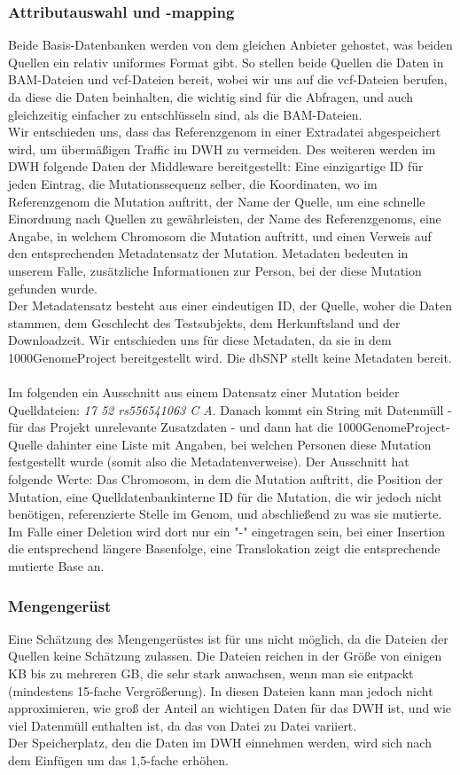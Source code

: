 \subsubsection{Attributauswahl und -mapping}
Beide Basis-Datenbanken werden von dem gleichen Anbieter gehostet, was beiden Quellen ein relativ uniformes Format gibt. So stellen beide Quellen die Daten in BAM-Dateien und vcf-Dateien bereit, wobei wir uns auf die vcf-Dateien berufen, da diese die Daten beinhalten, die wichtig sind für die Abfragen, und auch gleichzeitig einfacher zu entschlüsseln sind, als die BAM-Dateien.\\
Wir entschieden uns, dass das Referenzgenom in einer Extradatei abgespeichert wird, um übermäßigen Traffic im DWH zu vermeiden. Des weiteren werden im DWH folgende Daten der Middleware bereitgestellt: Eine einzigartige ID für jeden Eintrag, die Mutationssequenz selber, die Koordinaten, wo im Referenzgenom die Mutation auftritt, der Name der Quelle, um eine schnelle Einordnung nach Quellen zu gewährleisten, der Name des Referenzgenoms, eine Angabe, in welchem Chromosom die Mutation auftritt, und einen Verweis auf den entsprechenden Metadatensatz der Mutation. Metadaten bedeuten in unserem Falle, zusätzliche Informationen zur Person, bei der diese Mutation gefunden wurde.\\
Der Metadatensatz besteht aus einer eindeutigen ID, der Quelle, woher die Daten stammen, dem Geschlecht des Testsubjekts, dem Herkunftsland und der Downloadzeit. Wir entschieden uns für diese Metadaten, da sie in dem 1000GenomeProject bereitgestellt wird. Die dbSNP stellt keine Metadaten bereit.\\
\\
Im folgenden ein Ausschnitt aus einem Datensatz einer Mutation beider Quelldateien: \textit{17	52	rs556541063	C	A}. Danach kommt ein String mit Datenmüll - für das Projekt unrelevante Zusatzdaten - und dann hat die 1000GenomeProject-Quelle dahinter eine Liste mit Angaben, bei welchen Personen diese Mutation festgestellt wurde (somit also die Metadatenverweise). Der Ausschnitt hat folgende Werte: Das Chromosom, in dem die Mutation auftritt, die Position der Mutation, eine Quelldatenbankinterne ID für die Mutation, die wir jedoch nicht benötigen, referenzierte Stelle im Genom, und abschließend zu was sie mutierte. Im Falle einer Deletion wird dort nur ein "-" eingetragen sein, bei einer Insertion die entsprechend längere Basenfolge, eine Translokation zeigt die entsprechende mutierte Base an.
\subsubsection{Mengengerüst}
Eine Schätzung des Mengengerüstes ist für uns nicht möglich, da die Dateien der Quellen keine Schätzung zulassen. Die Dateien reichen in der Größe von einigen KB bis zu mehreren GB, die sehr stark anwachsen, wenn man sie entpackt (mindestens 15-fache Vergrößerung). In diesen Dateien kann man jedoch nicht approximieren, wie groß der Anteil an wichtigen Daten für das DWH ist, und wie viel Datenmüll enthalten ist, da das von Datei zu Datei variiert.\\
Der Speicherplatz, den die Daten im DWH einnehmen werden, wird sich nach dem Einfügen um das 1,5-fache erhöhen.\\
